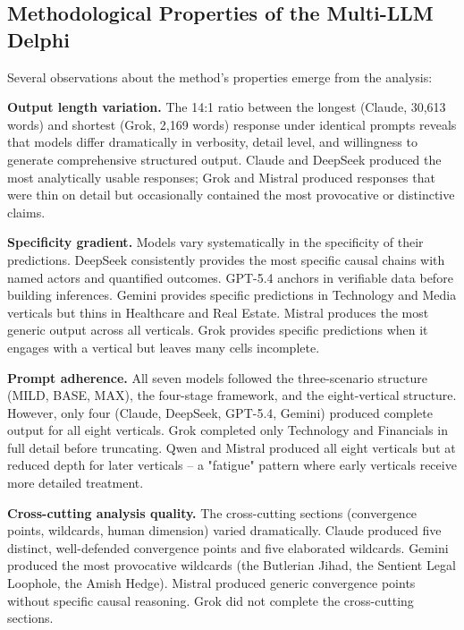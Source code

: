 \documentclass[preprint,review,12pt]{elsarticle}
\begin{document}
\subsection{Methodological Properties of the Multi-LLM Delphi}
\label{sec:methodological_properties}

Several observations about the method's properties emerge from the analysis:

\textbf{Output length variation.} The 14:1 ratio between the longest (Claude, 30,613 words) and shortest (Grok, 2,169 words) response under identical prompts reveals that models differ dramatically in verbosity, detail level, and willingness to generate comprehensive structured output. Claude and DeepSeek produced the most analytically usable responses; Grok and Mistral produced responses that were thin on detail but occasionally contained the most provocative or distinctive claims.

\textbf{Specificity gradient.} Models vary systematically in the specificity of their predictions. DeepSeek consistently provides the most specific causal chains with named actors and quantified outcomes. GPT-5.4 anchors in verifiable data before building inferences. Gemini provides specific predictions in Technology and Media verticals but thins in Healthcare and Real Estate. Mistral produces the most generic output across all verticals. Grok provides specific predictions when it engages with a vertical but leaves many cells incomplete.

\textbf{Prompt adherence.} All seven models followed the three-scenario structure (MILD, BASE, MAX), the four-stage framework, and the eight-vertical structure. However, only four (Claude, DeepSeek, GPT-5.4, Gemini) produced complete output for all eight verticals. Grok completed only Technology and Financials in full detail before truncating. Qwen and Mistral produced all eight verticals but at reduced depth for later verticals -- a "fatigue" pattern where early verticals receive more detailed treatment.

\textbf{Cross-cutting analysis quality.} The cross-cutting sections (convergence points, wildcards, human dimension) varied dramatically. Claude produced five distinct, well-defended convergence points and five elaborated wildcards. Gemini produced the most provocative wildcards (the Butlerian Jihad, the Sentient Legal Loophole, the Amish Hedge). Mistral produced generic convergence points without specific causal reasoning. Grok did not complete the cross-cutting sections.
\end{document}
